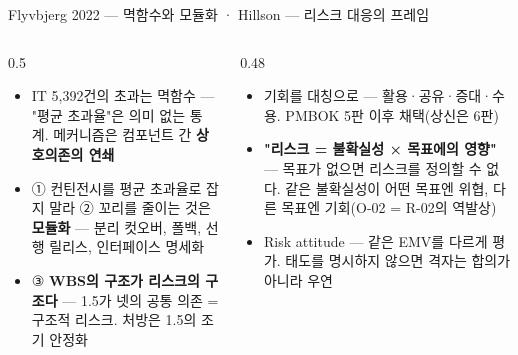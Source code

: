 \begin{frame}{Flyvbjerg 2022 — 멱함수와 모듈화 · Hillson — 리스크 대응의 프레임}
\begin{columns}[T]
\begin{column}{0.5\textwidth}
\begin{itemize}
\item IT 5,392건의 초과는 멱함수 — "평균 초과율"은 의미 없는 통계. 메커니즘은 컴포넌트 간 \textbf{상호의존의 연쇄}
\item ① 컨틴전시를 평균 초과율로 잡지 말라 ② 꼬리를 줄이는 것은 \textbf{모듈화} — 분리 컷오버, 폴백, 선행 릴리스, 인터페이스 명세화
\item ③ \textbf{WBS의 구조가 리스크의 구조다} — 1.5가 넷의 공통 의존 = 구조적 리스크. 처방은 1.5의 조기 안정화
\end{itemize}
\end{column}
\begin{column}{0.48\textwidth}
\begin{itemize}
\item 기회를 대칭으로 — 활용·공유·증대·수용. PMBOK 5판 이후 채택(상신은 6판)
\item \textbf{"리스크 = 불확실성 × 목표에의 영향"} — 목표가 없으면 리스크를 정의할 수 없다. 같은 불확실성이 어떤 목표엔 위협, 다른 목표엔 기회(O-02 = R-02의 역발상)
\item Risk attitude — 같은 EMV를 다르게 평가. 태도를 명시하지 않으면 격자는 합의가 아니라 우연
\end{itemize}
\end{column}
\end{columns}
\end{frame}

